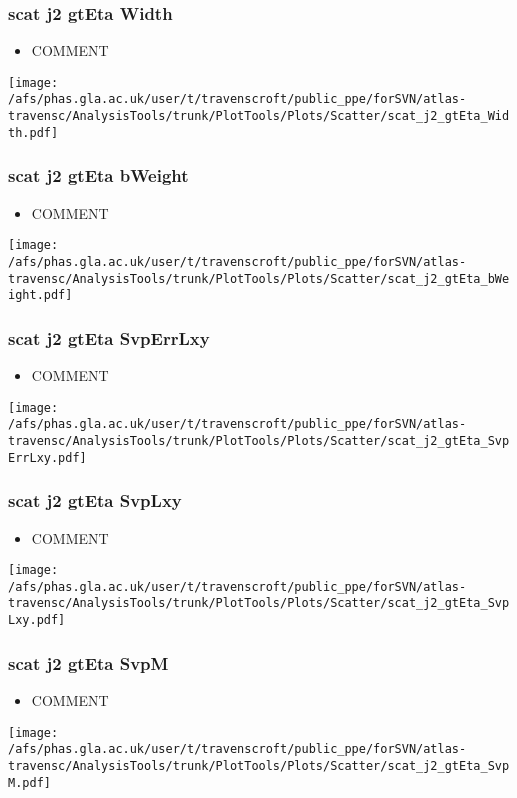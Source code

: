 \documentclass{beamer}
\begin{document}
\begin{frame}
\frametitle{scat j2 gtEta Width}
\begin{itemize}
\item COMMENT
\end{itemize}
\begin{center}
\texttt{[image: /afs/phas.gla.ac.uk/user/t/travenscroft/public\_ppe/forSVN/atlas-travensc/AnalysisTools/trunk/PlotTools/Plots/Scatter/scat\_j2\_gtEta\_Width.pdf]}
\end{center}
\end{frame}

\begin{frame}
\frametitle{scat j2 gtEta bWeight}
\begin{itemize}
\item COMMENT
\end{itemize}
\begin{center}
\texttt{[image: /afs/phas.gla.ac.uk/user/t/travenscroft/public\_ppe/forSVN/atlas-travensc/AnalysisTools/trunk/PlotTools/Plots/Scatter/scat\_j2\_gtEta\_bWeight.pdf]}
\end{center}
\end{frame}

\begin{frame}
\frametitle{scat j2 gtEta SvpErrLxy}
\begin{itemize}
\item COMMENT
\end{itemize}
\begin{center}
\texttt{[image: /afs/phas.gla.ac.uk/user/t/travenscroft/public\_ppe/forSVN/atlas-travensc/AnalysisTools/trunk/PlotTools/Plots/Scatter/scat\_j2\_gtEta\_SvpErrLxy.pdf]}
\end{center}
\end{frame}

\begin{frame}
\frametitle{scat j2 gtEta SvpLxy}
\begin{itemize}
\item COMMENT
\end{itemize}
\begin{center}
\texttt{[image: /afs/phas.gla.ac.uk/user/t/travenscroft/public\_ppe/forSVN/atlas-travensc/AnalysisTools/trunk/PlotTools/Plots/Scatter/scat\_j2\_gtEta\_SvpLxy.pdf]}
\end{center}
\end{frame}

\begin{frame}
\frametitle{scat j2 gtEta SvpM}
\begin{itemize}
\item COMMENT
\end{itemize}
\begin{center}
\texttt{[image: /afs/phas.gla.ac.uk/user/t/travenscroft/public\_ppe/forSVN/atlas-travensc/AnalysisTools/trunk/PlotTools/Plots/Scatter/scat\_j2\_gtEta\_SvpM.pdf]}
\end{center}
\end{frame}
\end{document}
